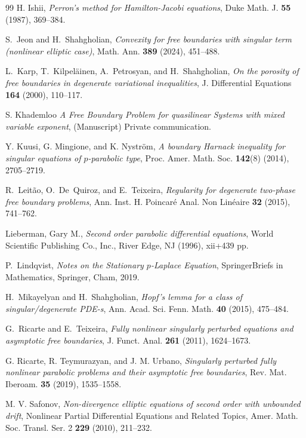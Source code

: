 \documentclass[11pt,oneside,english]{amsart}
\numberwithin{equation}{section}
\theoremstyle{plain}
\numberwithin{equation}{section}
\begin{document}
\begin{thebibliography}{99}
H. Ishii,
\emph{Perron’s method for Hamilton-Jacobi equations},
Duke Math. J. \textbf{55} (1987), 369--384.

S.~Jeon and H.~Shahgholian,
\emph{Convexity for free boundaries with singular term (nonlinear elliptic case)},
Math. Ann. \textbf{389} (2024), 451--488.

L.~Karp, T.~Kilpel{\"a}inen, A.~Petrosyan, and H.~Shahgholian,
\emph{On the porosity of free boundaries in degenerate variational inequalities},
J. Differential Equations \textbf{164} (2000), 110--117.

S. Khademloo
\emph{A Free Boundary Problem for  quasilinear Systems  with mixed variable exponent}, (Manuscript) Private communication.


Y. Kuusi, G. Mingione, and K. Nyström,  
\emph{A boundary Harnack inequality for singular equations of $p$-parabolic type}, 
Proc. Amer. Math. Soc.  \textbf{142}(8) (2014), 2705--2719. 

R.~Leit\~ao, O.~De~Quiroz, and E.~Teixeira,
\emph{Regularity for degenerate two-phase free boundary problems},
Ann. Inst. H. Poincar\'e Anal. Non Lin\'eaire \textbf{32} (2015), 741--762.


Lieberman, Gary M.,
\emph{Second order parabolic differential equations},
World Scientific Publishing Co., Inc., River Edge, NJ  (1996), xii+439 pp.


P.~Lindqvist,
\emph{Notes on the Stationary $p$-Laplace Equation},
SpringerBriefs in Mathematics, Springer, Cham, 2019.

H.~Mikayelyan and H.~Shahgholian,
\emph{Hopf's lemma for a class of singular/degenerate PDE-s},
Ann. Acad. Sci. Fenn. Math. \textbf{40} (2015), 475--484.

G.~Ricarte and E.~Teixeira,
\emph{Fully nonlinear singularly perturbed equations and asymptotic free boundaries},
J. Funct. Anal. \textbf{261} (2011), 1624--1673.

G. Ricarte, R. Teymurazyan, and J. M. Urbano,
\emph{Singularly perturbed fully nonlinear parabolic problems and their asymptotic free boundaries},
Rev. Mat. Iberoam. \textbf{35} (2019), 1535--1558.

M. V. Safonov,
\emph{Non-divergence elliptic equations of second order with unbounded drift},
Nonlinear Partial Differential Equations and Related Topics, Amer. Math. Soc. Transl. Ser. 2 \textbf{229} (2010), 211--232.


\end{thebibliography}
\end{document}
